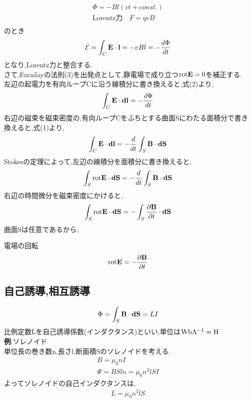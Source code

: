 \documentclass{jsarticle}
\begin{document}
\begin{eqnarray*}
\Phi = - Bl(vt+const.) \\
\mbox{Lorentz力} \quad F = qvB \\
\end{eqnarray*}
のとき
\begin{eqnarray*}
\mathcal{E} = \int_{C} {\bf E} \cdot {\bf l} = - vBl = -\frac{d \Phi}{dt}
\end{eqnarray*}
となり,Lorentz力と整合する.
\\
さて,Faradayの法則(3)を出発点として,静電場で成り立つ${\rm rot}{\bf E}=0$を補正する. \\
左辺の起電力を有向ループCに沿う線積分に書き換えると,式(2)より,
\begin{eqnarray*}
\int_{C} {\bf E} \cdot {\bf dl} = -\frac{d \Phi}{dt}
\end{eqnarray*}
右辺の磁束を磁束密度の,有向ループCをふちとする曲面Sにわたる面積分で書き換えると,式(1)より,
\begin{eqnarray*}
\int_{C} {\bf E} \cdot {\bf dl} = -\frac{d}{dt} \int_{S} {\bf B} \cdot {\bf dS}
\end{eqnarray*}
Stokesの定理によって,左辺の線積分を面積分に書き換えると,
\begin{eqnarray*}
\int_{S} {\rm rot}{\bf E} \cdot {\bf dS} = -\frac{d}{dt} \int_{S} {\bf B} \cdot {\bf dS}
\end{eqnarray*}
右辺の時間微分を磁束密度にかけると,
\begin{eqnarray*}
\int_{S} {\rm rot}{\bf E} \cdot {\bf dS} = -\int_{S} \frac{\partial {\bf B} }{\partial t} \cdot {\bf dS}
\end{eqnarray*}
曲面Sは任意であるから,

\begin{itembox}[c]{電場の回転}
\begin{eqnarray*}
{\rm rot}{\bf E} = -\frac{\partial {\bf B} }{\partial t}
\end{eqnarray*}
\end{itembox}


\subsection{自己誘導,相互誘導}
\begin{eqnarray*}
\Phi = \int_{S} {\bf B} \cdot {\bf dS} = LI
\end{eqnarray*}
比例定数Lを自己誘導係数(インダクタンス)といい,単位は${\rm WbA^{-1}=H}$ \\
{\bf 例}:ソレノイド \\
単位長の巻き数n,長さl,断面積Sのソレノイドを考える.
\begin{eqnarray*}
B = \mu_0 n I \\
\Phi = BSln = \mu_0 n^2 l S I 
\end{eqnarray*}
よってソレノイドの自己インダクタンスは,
\begin{eqnarray*}
L=\mu_0 n^2 l S
\end{eqnarray*}
\\
\end{document}
